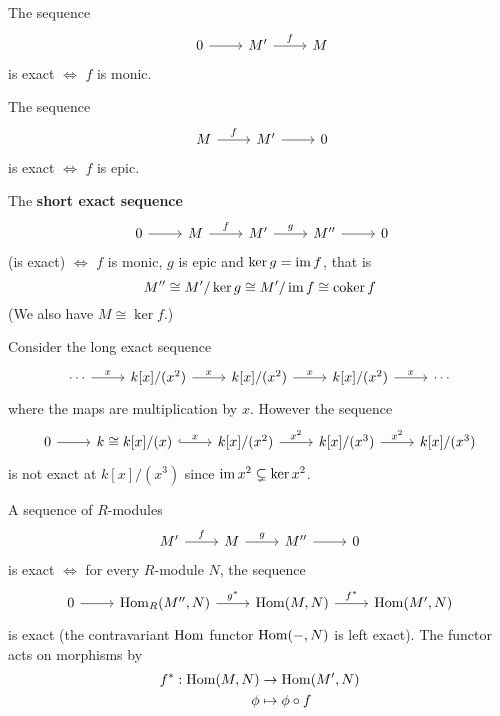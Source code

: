 \begin{exam}
	\leavevmode
	\begin{enum}
		\io The sequence
		\[\
		\begin{tikzcd}
			0 \ar[r] & M' \ar[r, "f"] & M
		\end{tikzcd}
		\]
		is exact $\iff$ $f$ is monic.
		
		\io The sequence
		\[\
		\begin{tikzcd}
			M \ar[r, "f"] & M' \ar[r] & 0
		\end{tikzcd}
		\]
		is exact $\iff$ $f$ is epic.
		
		\io The \textbf{short exact sequence}
		\[\
		\begin{tikzcd}
			0 \ar[r] & M \ar[r, "f"] & M' \ar[r, "g"] & M'' \ar[r] & 0
		\end{tikzcd}
		\]
		(is exact) $\iff$ $f$ is monic, $g$ is epic and $\ker g = \operatorname{im} f$, that is
		\[M'' \cong M'/\ker g \cong M'/\operatorname{im} f \cong \operatorname{coker} f\]
		(We also have $M \cong \ker f$.)
		
		\io Consider the long exact sequence
		\[
		\begin{tikzcd}
			\cdots \ar[r, "x"] & k[x]/(x^2) \ar[r, "x"] & k[x]/(x^2) \ar[r, "x"] & k[x]/(x^2) \ar[r, "x"] & \cdots
		\end{tikzcd}
		\]
		where the maps are multiplication by $x$.
		However the sequence
		\[
		\begin{tikzcd}
			0 \ar[r] & k \cong k[x]/(x) \ar[r, hookrightarrow, "x"] & k[x]/(x^2) \ar[r, "x^2"] & k[x]/(x^3) \ar[r, "x^2"] & k[x]/(x^3)
		\end{tikzcd}
		\]
		is not exact at $k[x]/(x^3)$ since $\operatorname{im} x^2 \subsetneq \ker x^2$.
	\end{enum}
\end{exam}

\begin{prop}[1.10]
	A sequence of $R$-modules
	\[
	\begin{tikzcd}
		M' \ar[r, "f"] & M \ar[r, "g"] & M'' \ar[r] & 0
	\end{tikzcd}
	\]
	is exact $\iff$ for every $R$-module $N$, the sequence
	\[
	\begin{tikzcd}
	0 \ar[r] & \Hom_R(M'',N) \ar[r, "g^*"] & \Hom(M,N) \ar[r, "f^*"] & \Hom(M',N)
	\end{tikzcd}
	\]
	is exact (the contravariant $\operatorname{Hom}$ functor $\operatorname{Hom}(-,N)$ is left exact).
	The functor acts on morphisms by
	\begin{align*}
		f^*: \operatorname{Hom}(M,N) &\to \operatorname{Hom}(M',N) \\
		\phi &\mapsto \phi \circ f
	\end{align*}
\end{prop}
